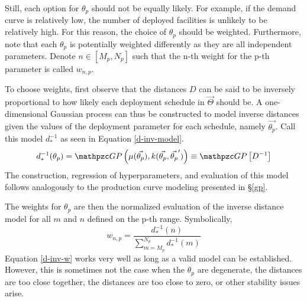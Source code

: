 Still, each option for $\theta_p$ should not be equally likely. 
For example, if the demand curve is relatively low, the number of deployed 
facilities is unlikely to be relatively high. For this reason, the choice 
of $\theta_p$ should be weighted.  Furthermore, note that each $\theta_p$
is potentially weighted differently as they are all independent parameters.
Denote $n \in [M_p, N_p]$ such that the n-th weight for the p-th parameter 
is called $w_{n,p}$. 

To choose weights, first observe that the distances $D$ can be said to be
inversely proportional to how likely each deployment schedule in 
$\vec{\Theta}$ should be. A one-dimensional Gaussian process can thus be
constructed to model inverse distances given the values of the deployment 
parameter for each schedule, namely $\vec{\theta_p}$.  Call this model 
$d_*^{-1}$ as seen in Equation \ref{d-inv-model}.
\begin{equation}
\label{d-inv-model}
d_*^{-1}(\theta_p) = \GP\left(\mu(\vec{\theta_p}), 
                              k(\vec{\theta_p}, \vec{\theta_p}^\prime)\right)
                   \equiv \GP\left[D^{-1}\right]
\end{equation}
The construction, regression of hyperparameters, and evaluation of this 
model follows analogously to the production curve modeling presented in 
\S\ref{gp}.

The weights for $\theta_p$ are then the normalized evaluation of the 
inverse distance model for all $m$ and $n$ defined on the p-th range.
Symbolically, 
\begin{equation}
\label{d-inv-w}
w_{n,p} = \frac{d_*^{-1}(n)}{\sum_{m=M_p}^{N_p} d_*^{-1}(m)}
\end{equation}
Equation \ref{d-inv-w} works very well as long as a valid model can 
be established.  However, this is sometimes not the case when the $\theta_p$
are degenerate, the distances are too close together, the distances are 
too close to zero, or other stability issues arise.

